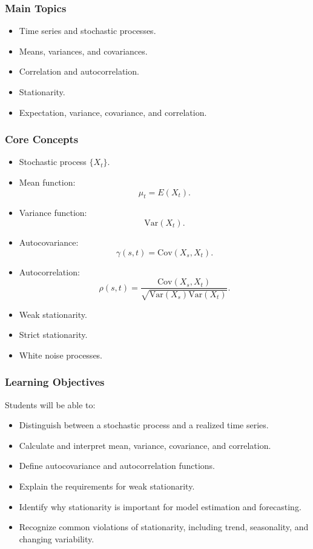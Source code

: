\documentclass[11pt]{article}
\begin{document}
\subsubsection*{Main Topics}
\begin{itemize}
    \item Time series and stochastic processes.
    \item Means, variances, and covariances.
    \item Correlation and autocorrelation.
    \item Stationarity.
    \item Expectation, variance, covariance, and correlation.
\end{itemize}

\subsubsection*{Core Concepts}
\begin{itemize}
    \item Stochastic process $\{X_t\}$.
    \item Mean function:
    \[
        \mu_t = E(X_t).
    \]
    \item Variance function:
    \[
        \mathrm{Var}(X_t).
    \]
    \item Autocovariance:
    \[
        \gamma(s,t) = \mathrm{Cov}(X_s,X_t).
    \]
    \item Autocorrelation:
    \[
        \rho(s,t) =
        \frac{\mathrm{Cov}(X_s,X_t)}
        {\sqrt{\mathrm{Var}(X_s)\mathrm{Var}(X_t)}}.
    \]
    \item Weak stationarity.
    \item Strict stationarity.
    \item White noise processes.
\end{itemize}

\subsubsection*{Learning Objectives}
Students will be able to:
\begin{itemize}
    \item Distinguish between a stochastic process and a realized time series.
    \item Calculate and interpret mean, variance, covariance, and correlation.
    \item Define autocovariance and autocorrelation functions.
    \item Explain the requirements for weak stationarity.
    \item Identify why stationarity is important for model estimation and forecasting.
    \item Recognize common violations of stationarity, including trend, seasonality, and changing variability.
\end{itemize}
\end{document}
